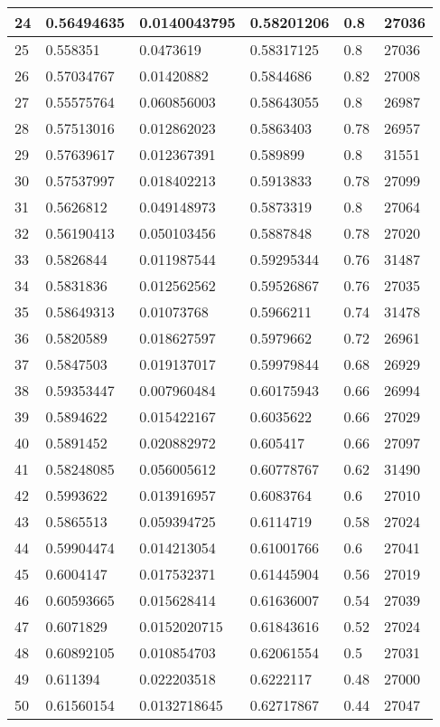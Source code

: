 \begin{longtable}{|l|l|l|l|l|l|}
24 & 0.56494635 & 0.0140043795 & 0.58201206 & 0.8 & 27036 \\ \hline 
25 & 0.558351 & 0.0473619 & 0.58317125 & 0.8 & 27036 \\ \hline 
26 & 0.57034767 & 0.01420882 & 0.5844686 & 0.82 & 27008 \\ \hline 
27 & 0.55575764 & 0.060856003 & 0.58643055 & 0.8 & 26987 \\ \hline 
28 & 0.57513016 & 0.012862023 & 0.5863403 & 0.78 & 26957 \\ \hline 
29 & 0.57639617 & 0.012367391 & 0.589899 & 0.8 & 31551 \\ \hline 
30 & 0.57537997 & 0.018402213 & 0.5913833 & 0.78 & 27099 \\ \hline 
31 & 0.5626812 & 0.049148973 & 0.5873319 & 0.8 & 27064 \\ \hline 
32 & 0.56190413 & 0.050103456 & 0.5887848 & 0.78 & 27020 \\ \hline 
33 & 0.5826844 & 0.011987544 & 0.59295344 & 0.76 & 31487 \\ \hline 
34 & 0.5831836 & 0.012562562 & 0.59526867 & 0.76 & 27035 \\ \hline 
35 & 0.58649313 & 0.01073768 & 0.5966211 & 0.74 & 31478 \\ \hline 
36 & 0.5820589 & 0.018627597 & 0.5979662 & 0.72 & 26961 \\ \hline 
37 & 0.5847503 & 0.019137017 & 0.59979844 & 0.68 & 26929 \\ \hline 
38 & 0.59353447 & 0.007960484 & 0.60175943 & 0.66 & 26994 \\ \hline 
39 & 0.5894622 & 0.015422167 & 0.6035622 & 0.66 & 27029 \\ \hline 
40 & 0.5891452 & 0.020882972 & 0.605417 & 0.66 & 27097 \\ \hline 
41 & 0.58248085 & 0.056005612 & 0.60778767 & 0.62 & 31490 \\ \hline 
42 & 0.5993622 & 0.013916957 & 0.6083764 & 0.6 & 27010 \\ \hline 
43 & 0.5865513 & 0.059394725 & 0.6114719 & 0.58 & 27024 \\ \hline 
44 & 0.59904474 & 0.014213054 & 0.61001766 & 0.6 & 27041 \\ \hline 
45 & 0.6004147 & 0.017532371 & 0.61445904 & 0.56 & 27019 \\ \hline 
46 & 0.60593665 & 0.015628414 & 0.61636007 & 0.54 & 27039 \\ \hline 
47 & 0.6071829 & 0.0152020715 & 0.61843616 & 0.52 & 27024 \\ \hline 
48 & 0.60892105 & 0.010854703 & 0.62061554 & 0.5 & 27031 \\ \hline 
49 & 0.611394 & 0.022203518 & 0.6222117 & 0.48 & 27000 \\ \hline 
50 & 0.61560154 & 0.0132718645 & 0.62717867 & 0.44 & 27047 \\ \hline 
\end{longtable}